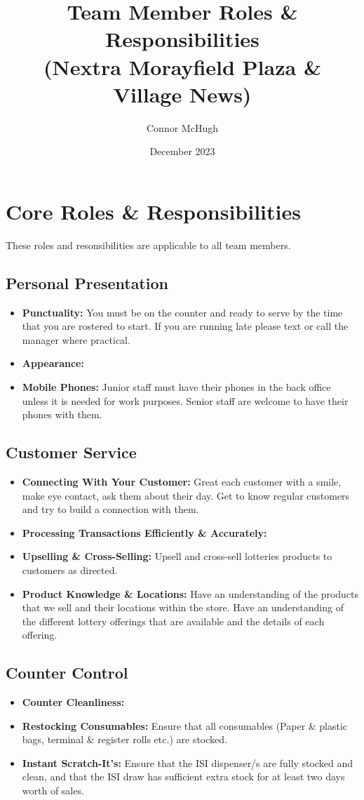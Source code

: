 \documentclass[12pt]{article}
\title{Team Member Roles \& Responsibilities \\ (Nextra Morayfield Plaza \& Village News)}
\author{Connor McHugh}
\date{December 2023}
\begin{document}
\maketitle
\section{Core Roles \& Responsibilities}
These roles and resonsibilities are applicable to all team members.
\subsection{Personal Presentation}
\begin{itemize}
    \item \textbf{Punctuality:} You must be on the counter and ready to serve by the time that you are rostered to start. If you are running late please text or call the manager where practical.
    \item \textbf{Appearance:}
    \item \textbf{Mobile Phones:} Junior staff must have their phones in the back office unless it is needed for work purposes. Senior staff are welcome to have their phones with them.
\end{itemize}

\subsection{Customer Service}
\begin{itemize}
    \item \textbf{Connecting With Your Customer:} Great each customer with a smile, make eye contact, ask them about their day. Get to know regular customers and try to build a connection with them.
    \item \textbf{Processing Transactions Efficiently \& Accurately:}
    \item \textbf{Upselling \& Cross-Selling:} Upsell and cross-sell lotteries products to customers as directed.
    \item \textbf{Product Knowledge \& Locations:} Have an understanding of the products that we sell and their locations within the store. Have an understanding of the different lottery offerings that are available and the details of each offering.
\end{itemize}

\subsection{Counter Control}
\begin{itemize}
    \item \textbf{Counter Cleanliness:}
    \item \textbf{Restocking Consumables:} Ensure that all consumables (Paper \& plastic bags, terminal \& register rolls etc.) are stocked.
    \item \textbf{Instant Scratch-It's:} Ensure that the ISI dispenser/s are fully stocked and clean, and that the ISI draw has sufficient extra stock for at least two days worth of sales.
\end{itemize}
\end{document}
